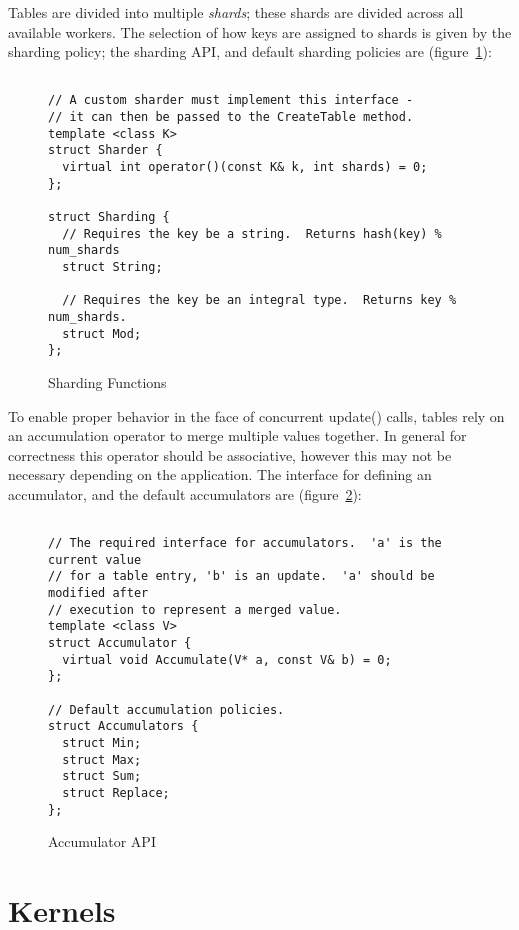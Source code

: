 \documentclass[10pt]{article}
\begin{document}
Tables are divided into multiple {\em shards}; these shards are divided across
all available workers.  The selection of how keys are assigned to shards is
given by the sharding policy; the sharding API, and default sharding policies
are (figure~\ref{fig:shardingapi}):

\begin{figure}[h!]
\begin{lstlisting}

// A custom sharder must implement this interface - 
// it can then be passed to the CreateTable method.
template <class K>
struct Sharder {
  virtual int operator()(const K& k, int shards) = 0;
};

struct Sharding {
  // Requires the key be a string.  Returns hash(key) % num_shards
  struct String;
  
  // Requires the key be an integral type.  Returns key % num_shards.
  struct Mod;
};
\end{lstlisting}
\caption{\sffamily Sharding Functions}
\label{fig:shardingapi}
\end{figure}

To enable proper behavior in the face of concurrent update() calls, tables rely
on an accumulation operator to merge multiple values together.  In general for
correctness this operator should be associative, however this may not be
necessary depending on the application.  The interface for defining an
accumulator, and the default accumulators are (figure~\ref{fig:accumapi}):

\begin{figure}[h!]
\begin{lstlisting}  

// The required interface for accumulators.  'a' is the current value
// for a table entry, 'b' is an update.  'a' should be modified after
// execution to represent a merged value. 
template <class V>
struct Accumulator {
  virtual void Accumulate(V* a, const V& b) = 0;
};

// Default accumulation policies.
struct Accumulators {
  struct Min;
  struct Max;
  struct Sum;
  struct Replace;
};

\end{lstlisting}
\caption{\sffamily Accumulator API}
\label{fig:accumapi}
\end{figure}

\section{Kernels}
\end{document}
